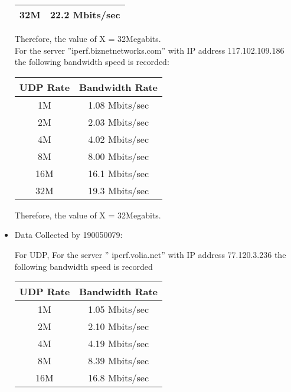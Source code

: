 \documentclass[12pt]{article}
\theoremstyle{remark}
\begin{document}
\begin{itemize}
\begin{table}[H]
\begin{tabular}{|c| c|}
        32M & 22.2 Mbits/sec
\\
\hline
    \end{tabular}%
\end{table}
Therefore, the value of X = 32Megabits.\\

For the server ”iperf.biznetnetworks.com” with IP address 117.102.109.186 the following bandwidth speed is recorded:
\begin{table}[H]
    \begin{tabular}{|c| c|}
         \hline
         \textbf{UDP Rate} &  \textbf{Bandwidth Rate}\\
         \hline
         1M & 1.08 Mbits/sec
\\
         2M &   2.03 Mbits/sec
\\
         4M &   4.02 Mbits/sec
\\
         8M & 8.00 Mbits/sec

\\
        16M &  16.1 Mbits/sec
\\
        
        32M & 19.3 Mbits/sec
\\
\hline
    \end{tabular}%
\end{table}
Therefore, the value of X = 32Megabits.\\

    \item Data Collected by 190050079:
\begin{table}[H]
    \centering
     \caption{TCP Bandwidth Rates}
\end{table}
For UDP,
For the server ” iperf.volia.net” with IP address 77.120.3.236 the following bandwidth speed is recorded\\
\begin{table}[H]
    \begin{tabular}{|c| c|}
         \hline
         \textbf{UDP Rate} &  \textbf{Bandwidth Rate}\\
         \hline
         1M & 1.05 Mbits/sec\\
         2M &  2.10 Mbits/sec\\
         4M &  4.19 Mbits/sec\\
         8M & 8.39 Mbits/sec
\\
        16M &   16.8 Mbits/sec\\
        

\end{tabular}
\end{table}
\end{itemize}
\end{document}
